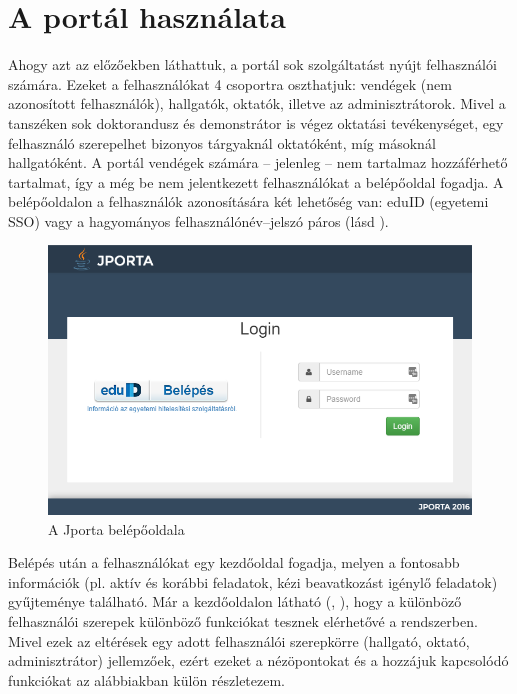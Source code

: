 \section{A portál használata}
Ahogy azt az előzőekben láthattuk, a portál sok szolgáltatást nyújt felhasználói számára. 
Ezeket a felhasználókat 4 csoportra oszthatjuk: vendégek (nem azonosított felhasználók), hallgatók, oktatók, illetve az adminisztrátorok.
Mivel a tanszéken sok doktorandusz és demonstrátor is végez oktatási tevékenységet, egy felhasználó szerepelhet bizonyos tárgyaknál oktatóként, míg másoknál hallgatóként.
A portál vendégek számára -- jelenleg -- nem tartalmaz hozzáférhető tartalmat, így a még be nem jelentkezett felhasználókat a belépőoldal fogadja.
A belépőoldalon a felhasználók azonosítására két lehetőség van: eduID (egyetemi SSO) vagy a hagyományos felhasználónév--jelszó páros (lásd ).
\begin{figure}[h]
    \centering
    \includegraphics[width=\textwidth]{figures/Jporta-login}
    \caption{A Jporta belépőoldala}
    \label{figure:jporta-login}
\end{figure}
Belépés után a felhasználókat egy kezdőoldal fogadja, melyen a fontosabb információk (pl. aktív és korábbi feladatok, kézi beavatkozást igénylő feladatok) gyűjteménye található.
Már a kezdőoldalon látható (, ), hogy a különböző felhasználói szerepek különböző funkciókat tesznek elérhetővé a rendszerben.
Mivel ezek az eltérések egy adott felhasználói szerepkörre (hallgató, oktató, adminisztrátor) jellemzőek, ezért ezeket a nézöpontokat és a hozzájuk kapcsolódó funkciókat az alábbiakban külön részletezem.

